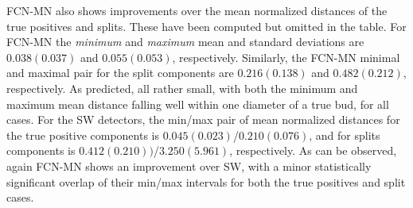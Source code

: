 \documentclass[a4paper,authoryear,review]{elsarticle}
\begin{document}
FCN-MN also shows improvements over the mean normalized distances of the true positives and splits. These have been computed but omitted in the table. For FCN-MN the \emph{minimum} and \emph{maximum} mean and standard deviations are $0.038(0.037)$ and $0.055(0.053)$, respectively. Similarly, the FCN-MN minimal and maximal pair for the split components are $0.216(0.138)$ and $0.482(0.212)$, respectively. As predicted, all rather small, with both the minimum and maximum mean distance falling well within one diameter of a true bud, for all cases.
%
For the SW detectors, the min/max pair of mean normalized distances for the true positive components is $0.045(0.023)$/$0.210(0.076)$, and for splits components is $0.412(0.210))$/$3.250(5.961)$, respectively. 
%
As can be observed, again FCN-MN shows an improvement over SW, with a minor statistically significant overlap of their min/max intervals for both the true positives and split cases.
\end{document}
